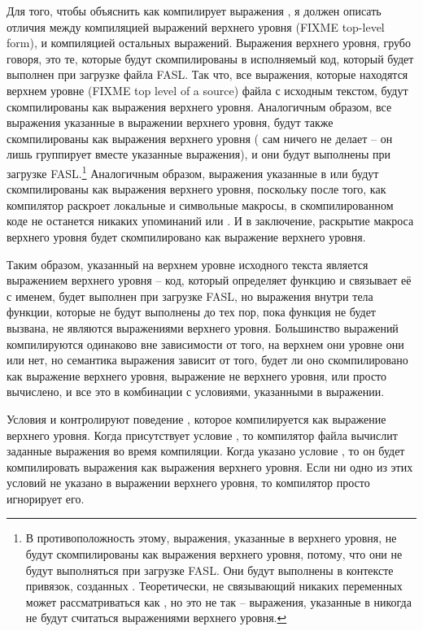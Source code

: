 Для того, чтобы объяснить как  компилирует выражения ,
я должен описать отличия между компиляцией выражений верхнего уровня (FIXME top-level
form), и компиляцией остальных выражений.  Выражения верхнего уровня, грубо говоря, это
те, которые будут скомпилированы в исполняемый код, который будет выполнен при загрузке
файла FASL.  Так что, все выражения, которые находятся верхнем уровне (FIXME top level of
a source) файла с исходным текстом, будут скомпилированы как выражения верхнего
уровня. Аналогичным образом, все выражения указанные в выражении  верхнего
уровня, будут также скомпилированы как выражения верхнего уровня ( сам ничего
не делает -- он лишь группирует вместе указанные выражения), и они будут выполнены при
загрузке FASL.\footnote{В противоположность этому, выражения, указанные в 
  верхнего уровня, не будут скомпилированы как выражения верхнего уровня, потому, что они
  не будут выполняться при загрузке FASL.  Они будут выполнены в контексте привязок,
  созданных . Теоретически,  не связывающий никаких переменных может
  рассматриваться как , но это не так -- выражения, указанные в 
  никогда не будут считаться выражениями верхнего уровня.}  Аналогичным образом, выражения
указанные в  или  будут скомпилированы как выражения
верхнего уровня, поскольку после того, как компилятор раскроет локальные и символьные
макросы, в скомпилированном коде не останется никаких упоминаний  или
.  И в заключение, раскрытие макроса верхнего уровня будет
скомпилировано как выражение верхнего уровня.

Таким образом,  указанный на верхнем уровне исходного текста является
выражением верхнего уровня -- код, который определяет функцию и связывает её с именем,
будет выполнен при загрузке FASL, но выражения внутри тела функции, которые не будут
выполнены до тех пор, пока функция не будет вызвана, не являются выражениями верхнего
уровня.  Большинство выражений компилируются одинаково вне зависимости от того, на верхнем
они уровне они или нет, но семантика выражения  зависит от того, будет ли
оно скомпилировано как выражение верхнего уровня, выражение не верхнего уровня, или просто
вычислено, и все это в комбинации с условиями, указанными в выражении.

Условия  и  контролируют поведение
, которое компилируется как выражение верхнего уровня.  Когда присутствует
условие , то компилятор файла вычислит заданные выражения во время
компиляции.  Когда указано условие , то он будет компилировать
выражения как выражения верхнего уровня.  Если ни одно из этих условий не указано в
выражении  верхнего уровня, то компилятор просто игнорирует его.

